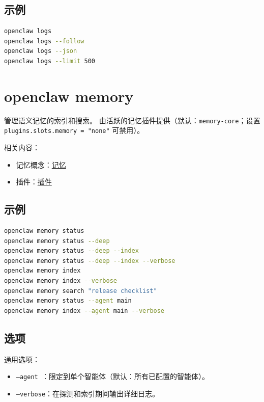 \subsection{示例}


\begin{lstlisting}[language=bash]
openclaw logs
openclaw logs --follow
openclaw logs --json
openclaw logs --limit 500
\end{lstlisting}



\clearpage

\section{openclaw memory}


管理语义记忆的索引和搜索。
由活跃的记忆插件提供（默认：\texttt{memory-core}；设置 \texttt{plugins.slots.memory = "none"} 可禁用）。

相关内容：

\begin{itemize}
  \item 记忆概念：\href{/concepts/memory}{记忆}
  \item 插件：\href{/tools/plugin}{插件}
\end{itemize}


\subsection{示例}


\begin{lstlisting}[language=bash]
openclaw memory status
openclaw memory status --deep
openclaw memory status --deep --index
openclaw memory status --deep --index --verbose
openclaw memory index
openclaw memory index --verbose
openclaw memory search "release checklist"
openclaw memory status --agent main
openclaw memory index --agent main --verbose
\end{lstlisting}


\subsection{选项}


通用选项：

\begin{itemize}
  \item \texttt{--agent }：限定到单个智能体（默认：所有已配置的智能体）。
  \item \texttt{--verbose}：在探测和索引期间输出详细日志。
\end{itemize}


